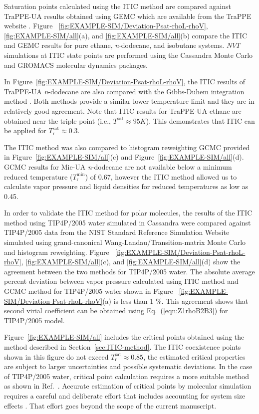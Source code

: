 \documentclass[5p,times]{elsarticle}
\begin{document}
Saturation points calculated using the ITIC method are compared against TraPPE-UA results obtained using GEMC which are available from the TraPPE website \cite{eggimann2014}. Figure~ \ref{fig:EXAMPLE-SIM/Deviation-Psat-rhoL-rhoV}, \ref{fig:EXAMPLE-SIM/all}(a), and \ref{fig:EXAMPLE-SIM/all}(b) compare the ITIC and GEMC results for pure ethane, \textit{n}-dodecane, and isobutane systems. $NVT$ simulations at ITIC state points are performed using the Cassandra Monte Carlo \cite{Shah2017} and GROMACS molecular dynamics \cite{Lindahl2001} packages. 

In Figure~\ref{fig:EXAMPLE-SIM/Deviation-Psat-rhoL-rhoV}, the ITIC results of TraPPE-UA \textit{n}-dodecane are also compared with the Gibbs-Duhem integration method \cite{Ungerer2000}. Both methods provide a similar lower temperature limit and they are in relatively good agreement. Note that ITIC results for TraPPE-UA ethane are obtained near the triple point (i.e., $T^\mathrm{sat} \approx 95 K$). This demonstrates that ITIC can be applied for $T_\mathrm{r}^\mathrm{sat} \approx 0.3$.

The ITIC method was also compared to histogram reweighting GCMC provided in Figure~\ref{fig:EXAMPLE-SIM/all}(c) and Figure~\ref{fig:EXAMPLE-SIM/all}(d). GCMC results for Mie-UA \textit{n}-dodecane are not available below a minimum reduced temperature ($T_\mathrm{r}^{\mathrm{min}}$) of 0.67, however the ITIC method allowed us to calculate vapor pressure and liquid densities for reduced temperatures as low as 0.45. 

In order to validate the ITIC method for polar molecules, the results of the ITIC method using TIP4P/2005 water simulated in Cassandra were compared against TIP4P/2005 data from the NIST Standard Reference Simulation Website \cite{Shen2008} simulated using grand-canonical Wang-Landau/Transition-matrix Monte Carlo and histogram reweighting. Figure~ \ref{fig:EXAMPLE-SIM/Deviation-Psat-rhoL-rhoV}, \ref{fig:EXAMPLE-SIM/all}(c), and \ref{fig:EXAMPLE-SIM/all}(d) show the agreement between the two methods for TIP4P/2005 water. The absolute average percent deviation between vapor pressure calculated using ITIC method and GCMC method for TIP4P/2005 water shown in Figure~ \ref{fig:EXAMPLE-SIM/Deviation-Psat-rhoL-rhoV}(a) is less than 1 \%. This agreement shows that second virial coefficient can be obtained using Eq.~(\ref{eqn:Z1rhoB2B3}) for TIP4P/2005 model.

Figure~\ref{fig:EXAMPLE-SIM/all} includes the critical points obtained using the method described in Section~\ref{sec:ITIC-method}. The ITIC coexistence points 
shown in this figure do not exceed $T_\mathrm{r}^\mathrm{sat} \approx 0.85$, the estimated critical properties are subject to larger uncertainties and possible systematic deviations. In the case of TIP4P/2005 water, critical point calculation requires a more suitable method as shown in Ref.~\cite{Vega2006}. Accurate estimation of critical points by molecular simulation requires a careful and deliberate effort that includes accounting for system size effects \cite{orkoulas2001precise}. That effort goes beyond the scope of the current manuscript.
\end{document}
